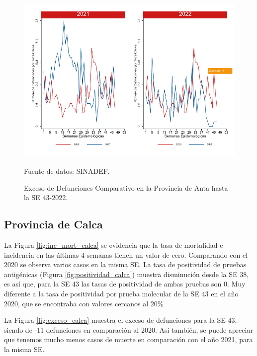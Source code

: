 \documentclass[12pt,a4paper,openany]{book}
\begin{document}
	\begin{figure}[h]
		\caption{Exceso de Defunciones Comparativo en la Provincia de Anta hasta la SE 43-2022.}\label{fig:exceso_anta}
		\begin{center}
			\includegraphics[width=0.7\linewidth]{../figuras/exceso_2.pdf}
		\end{center}
		{\footnotesize {Fuente de datos: SINADEF.}}
	\end{figure}
	
	\clearpage
	
	\subsection*{Provincia de Calca}
	\noindent La Figura \ref{fig:inc_mort_calca} se evidencia que la tasa de mortalidad e incidencia en las últimas 4 semanas tienen un valor de cero.  Comparando con el 2020 se observa varios casos en la misma SE. La tasa de positividad de pruebas antigénicas (Figura \ref{fig:positividad_calca}) muestra disminución desde la SE 38, es así que, para la SE 43 las tasas de positividad de ambas pruebas son 0. Muy diferente a la tasa de positividad por prueba molecular de la SE 43 en el año 2020, que se encontraba con valores cercanos al 20$\%$
	
	La Figura \ref{fig:exceso_calca} muestra el exceso de defunciones para la SE 43, siendo de -11 defunciones en comparación al 2020. Así también, se puede apreciar que tenemos mucho menos casos de muerte en comparación con el año 2021, para la misma SE.
	
\end{document}
